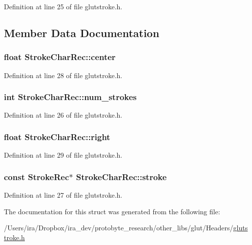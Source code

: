 Definition at line 25 of file glutstroke.\-h.



\subsection{Member Data Documentation}
\hypertarget{struct_stroke_char_rec_a174a58be9841b6d0f2dad1a73d5adca6}{
\subsubsection[{center}]{\setlength{\rightskip}{0pt plus 5cm}float Stroke\-Char\-Rec\-::center}}\label{struct_stroke_char_rec_a174a58be9841b6d0f2dad1a73d5adca6}


Definition at line 28 of file glutstroke.\-h.

\hypertarget{struct_stroke_char_rec_a4a6ad5b0d9b44913d3b7ee7e903b0672}{
\subsubsection[{num\-\_\-strokes}]{\setlength{\rightskip}{0pt plus 5cm}int Stroke\-Char\-Rec\-::num\-\_\-strokes}}\label{struct_stroke_char_rec_a4a6ad5b0d9b44913d3b7ee7e903b0672}


Definition at line 26 of file glutstroke.\-h.

\hypertarget{struct_stroke_char_rec_aa6cfe683a399f3c7866cc3f01dbe2678}{
\subsubsection[{right}]{\setlength{\rightskip}{0pt plus 5cm}float Stroke\-Char\-Rec\-::right}}\label{struct_stroke_char_rec_aa6cfe683a399f3c7866cc3f01dbe2678}


Definition at line 29 of file glutstroke.\-h.

\hypertarget{struct_stroke_char_rec_aea565a6727bf8d994de3f44b34a01d24}{
\subsubsection[{stroke}]{\setlength{\rightskip}{0pt plus 5cm}const {\bf Stroke\-Rec}$\ast$ Stroke\-Char\-Rec\-::stroke}}\label{struct_stroke_char_rec_aea565a6727bf8d994de3f44b34a01d24}


Definition at line 27 of file glutstroke.\-h.



The documentation for this struct was generated from the following file\-:\begin{DoxyCompactItemize}
\item 
/\-Users/ira/\-Dropbox/ira\-\_\-dev/protobyte\-\_\-research/other\-\_\-libs/glut/\-Headers/\hyperlink{glutstroke_8h}{glutstroke.\-h}\end{DoxyCompactItemize}

